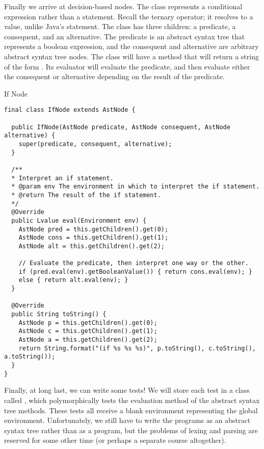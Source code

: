 \begin{verbnobox}[\footnotesize]
Finally we arrive at decision-based nodes. The  class represents a conditional expression rather than a statement. Recall the ternary operator; it resolves to a value, unlike Java's  statement. The  class has three children: a predicate, a consequent, and an alternative. The predicate is an abstract syntax tree that represents a boolean expression, and the consequent and alternative are arbitrary abstract syntax tree nodes. The  class will have a  method that will return a string of the form . Its evaluator will evaluate the predicate, and then evaluate either the consequent or alternative depending on the result of the predicate.

\begin{cl}[]{If Node}
\begin{lstlisting}[language=MyJava]
final class IfNode extends AstNode {
  
  public IfNode(AstNode predicate, AstNode consequent, AstNode alternative) {
    super(predicate, consequent, alternative);
  }

  /**
  * Interpret an if statement.
  * @param env The environment in which to interpret the if statement.
  * @return The result of the if statement.
  */
  @Override
  public Lvalue eval(Environment env) {
    AstNode pred = this.getChildren().get(0);
    AstNode cons = this.getChildren().get(1);
    AstNode alt = this.getChildren().get(2);

    // Evaluate the predicate, then interpret one way or the other.
    if (pred.eval(env).getBooleanValue()) { return cons.eval(env); } 
    else { return alt.eval(env); }
  }
  
  @Override
  public String toString() {
    AstNode p = this.getChildren().get(0);
    AstNode c = this.getChildren().get(1);
    AstNode a = this.getChildren().get(2);
    return String.format("(if %s %s %s)", p.toString(), c.toString(), a.toString());
  }
}
\end{lstlisting}
\end{cl}

Finally, at long last, we can write some tests! We will store each test in a class called , which polymorphically tests the evaluation method of the abstract syntax tree methods. These tests all receive a blank environment representing the global environment. Unfortunately, we still have to write the programs as an abstract syntax tree rather than as a program, but the problems of lexing and parsing are reserved for some other time (or perhaps a separate course altogether).


\end{verbnobox}
